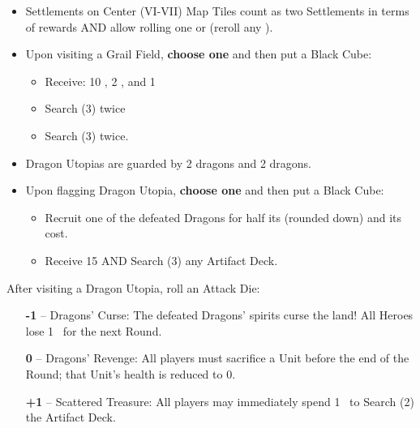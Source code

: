 \begin{multicols*}{2}
\begin{itemize}
  \item Settlements on Center (VI-VII) Map Tiles count as two Settlements in terms of rewards AND allow rolling one  or  (reroll any ).

  \item Upon visiting a Grail Field, \textbf{choose one} and then put a Black Cube:
  \begin{itemize}
    \item Receive: 10 , 2 , and 1 
    \item Search (3)  twice 
    \item Search (3)  twice.
  \end{itemize}

  \item Dragon Utopias are guarded by 2  dragons and 2  dragons. 
  \item Upon flagging Dragon Utopia, \textbf{choose one} and then put a Black Cube:
  \begin{itemize}
    \item Recruit one of the defeated Dragons for half its  (rounded down) and its  cost.
    \item Receive 15  AND Search (3) any Artifact Deck.
  \end{itemize}
\end{itemize}
After visiting a Dragon Utopia, roll an Attack Die:
\begin{itemize}
  \item[\textbf{-1}] -- Dragons' Curse: The defeated Dragons’ spirits curse the land! All Heroes lose \mbox{1 } for the next Round.
  \item[\textbf{0}] -- Dragons' Revenge: All players must sacrifice a Unit before the end of the Round; that Unit's health is reduced to 0.
  \item[ \textbf{+1}] -- Scattered Treasure: All players may immediately spend \mbox{1 } to Search (2) the Artifact Deck.
\end{itemize}


\end{multicols*}
